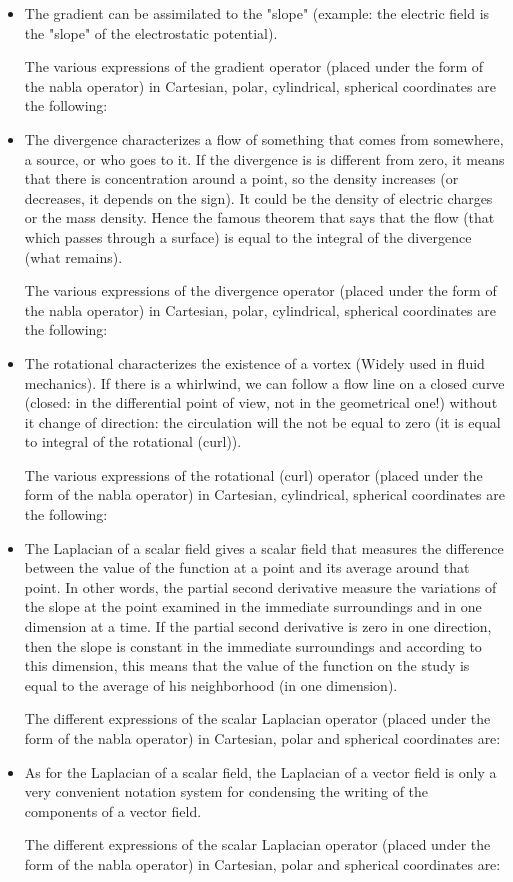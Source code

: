 	\begin{itemize}
		\item The gradient can be assimilated to the "slope" (example: the electric field is the "slope" of the electrostatic potential).
		
		The various expressions of the gradient operator (placed under the form of the nabla operator) in Cartesian, polar, cylindrical, spherical coordinates are the following:
		
		
		\item The divergence characterizes a flow of something that comes from somewhere, a source, or who goes to it. If the divergence is is different from zero, it means that there is concentration around a point, so the density increases (or decreases, it depends on the sign). It could be the density of electric charges or the mass density. Hence the famous theorem that says that the flow (that which passes through a surface) is equal to the integral of the divergence (what remains).
		
		The various expressions of the divergence operator (placed under the form of the nabla operator) in Cartesian, polar, cylindrical, spherical coordinates are the following:
		
		
		\item The rotational characterizes the existence of a vortex (Widely used in fluid mechanics). If there is a whirlwind, we can follow a flow line on a closed curve (closed: in the differential point of view, not in the geometrical one!) without it change of direction: the circulation will the not be equal to zero (it is equal to integral of the rotational (curl)).
		
		The various expressions of the rotational (curl) operator (placed under the form of the nabla operator) in Cartesian, cylindrical, spherical coordinates are the following:
		
		
		\item The Laplacian of a scalar field gives a scalar field that measures the difference between the value of the function at a point and its average around that point. In other words, the partial second derivative measure the variations of the slope at the point examined in the immediate surroundings and in one dimension at a time. If the partial second derivative is zero in one direction, then the slope is constant in the immediate surroundings and according to this dimension, this means that the value of the function on the study is equal to the average of his neighborhood (in one dimension).
		
		The different expressions of the scalar Laplacian operator (placed under the form of the nabla operator) in Cartesian, polar and spherical coordinates are:
		
		
		\item As for the Laplacian of a scalar field, the Laplacian of a vector field is only a very convenient notation system for condensing the writing of the components of a vector field.
		
		The different expressions of the scalar Laplacian operator (placed under the form of the nabla operator) in Cartesian, polar and spherical coordinates are:
		
	\end{itemize}
